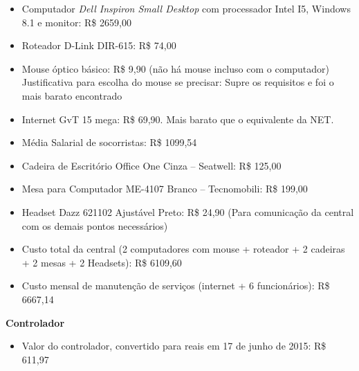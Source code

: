 \begin{itemize}
 \item Computador \textit{Dell Inspiron Small Desktop} com processador Intel I5, Windows 8.1 e monitor: R\$ 2659,00  \footnotemark
{}

  \item Roteador D-Link DIR-615: R\$ 74,00

  \item Mouse óptico básico: R\$ 9,90 (não há mouse incluso com o computador) \footnotemark
    \subitem *Justificativa para escolha do mouse se precisar: Supre os requisitos e foi o mais barato encontrado

  \item Internet GvT 15 mega: R\$ 69,90. \footnotemark
    \subitem *Mais barato que o equivalente da NET.

  \item Média Salarial de socorristas: R\$ 1099,54 \footnotemark

  \item Cadeira de Escritório Office One Cinza – Seatwell: R\$ 125,00 \footnotemark

  \item Mesa para Computador ME-4107 Branco – Tecnomobili: R\$ 199,00 \footnotemark

  \item Headset Dazz 621102 Ajustável Preto: R\$ 24,90 \footnotemark
    \subitem(Para comunicação da central com os demais pontos necessários)

  \item Custo total da central (2 computadores com mouse + roteador + 2 cadeiras + 2 mesas + 2 Headsets): R\$ 6109,60
  \item Custo mensal de manutenção de serviços (internet + 6 funcionários): R\$ 6667,14 



\end{itemize}


\indent \textbf{Controlador}

\begin{itemize}
  \item Valor do controlador, convertido para reais em 17 de junho de 2015: R\$ 611,97 
\end{itemize}

